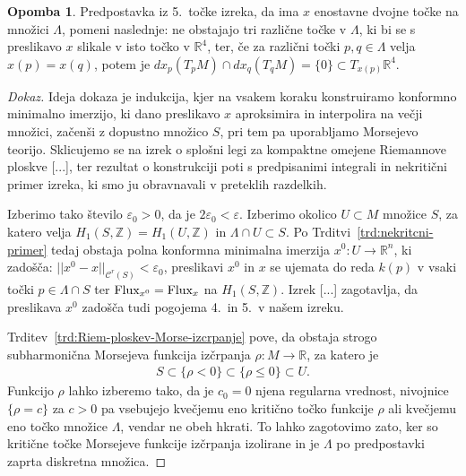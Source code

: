 \documentclass[12pt,a4paper,twoside]{article}
\theoremstyle{definition} %
\newtheorem{opomba}[definicija]{Opomba}
\newenvironment{dokaz}[1][Dokaz]{\begin{proof}[#1]}{\end{proof}}
\theoremstyle{plain} %
\numberwithin{equation}{section}  %
\begin{document}
\begin{opomba}
Predpostavka iz 5.~točke izreka, da ima $x$ enostavne dvojne točke na množici $\Lambda$, pomeni naslednje:
ne obstajajo tri različne točke v $\Lambda$, ki bi se s preslikavo $x$ slikale v isto točko v $\mathbb{R}^{4}$, ter, če za različni točki $p, q \in \Lambda$ velja $x(p) = x(q)$, potem je $dx_{p}(T_{p}M) \cap dx_{q}(T_{q}M) = \{ 0 \} \subset T_{x(p)}\mathbb{R}^{4}$.
\end{opomba}

\begin{dokaz}
Ideja dokaza je indukcija, kjer na vsakem koraku konstruiramo konformno minimalno imerzijo, ki dano preslikavo $x$ aproksimira in interpolira na večji množici, začenši z dopustno množico $S$, pri tem pa uporabljamo Morsejevo teorijo. 
Sklicujemo se na izrek o splošni legi za kompaktne omejene Riemannove ploskve [...], %
ter rezultat o konstrukciji poti s predpisanimi integrali in nekritični primer izreka, ki smo ju obravnavali v preteklih razdelkih.

Izberimo tako število $\varepsilon_0 > 0$, da je $2 \varepsilon_0 < \varepsilon$.
Izberimo okolico $U \subset M$ množice $S$, za katero velja $H_{1}(S, \mathbb{Z}) = H_{1}(U, \mathbb{Z})$ in $\Lambda \cap U \subset S$.
Po Trditvi~\ref{trd:nekritcni-primer} tedaj obstaja polna konformna minimalna imerzija $x^{0} \colon U \to \mathbb{R}^{n}$, ki zadošča:
$ ||x^{0}-x||_{\mathcal{C}^{r}(S)} < \varepsilon_0$, preslikavi $x^{0}$ in $x$ se ujemata do reda $k(p)$ v vsaki točki $p \in \Lambda \cap S$ ter $ \textup{Flux}_{x^{0}} = \textup{Flux}_{x}$ na $H_{1}(S, \mathbb{Z})$.
Izrek [...] %
zagotavlja, da preslikava $x^{0}$ zadošča tudi pogojema 4.~in 5.~v našem izreku.

Trditev~\ref{trd:Riem-ploskev-Morse-izcrpanje} pove, da obstaja strogo subharmonična Morsejeva funkcija izčrpanja $\rho \colon M \to \mathbb{R}$, za katero je
\begin{gather*}
S \subset \{ \rho < 0 \} \subset \{ \rho \leq 0 \} \subset U.
\end{gather*}
Funkcijo $\rho$ lahko izberemo tako, da je $c_0 = 0$ njena regularna vrednost, nivojnice $\{ \rho = c \}$ za $c>0$ pa vsebujejo kvečjemu eno kritično točko funkcije $\rho$ ali kvečjemu eno točko množice $\Lambda$, vendar ne obeh hkrati. To lahko zagotovimo zato, ker so kritične točke Morsejeve funkcije izčrpanja izolirane in je $\Lambda$ po predpostavki zaprta diskretna množica.


\end{dokaz}
\end{document}
